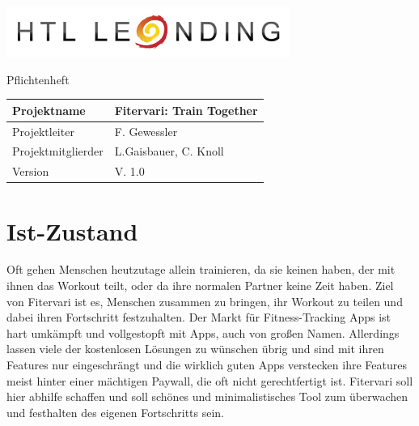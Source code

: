 \documentclass[12pt]{article}
\theoremstyle{definition}
\newcommand{\projektname}{Fitervari: Train Together}
\newcommand{\doctype}{Pflichtenheft}
\newcommand{\projektleiter}{F. Gewessler}
\newcommand{\projektmitglieder}{L.Gaisbauer, C. Knoll}
\newcommand{\version}{V. 1.0}
\begin{document}
\begin{titlepage}
\begin{flushright}
\includegraphics[scale=.5]{htlleondinglogo.png}\\
\end{flushright}

\vspace{10em}

\begin{flushright}

\end{flushright}
\begin{center}
{\LARGE \doctype} \\[3em]
\end{center}
\pagebreak


\begin{flushleft}
\begin{tabular}{|l|l|}
\hline
Projektname & \projektname \\ \hline
Projektleiter & \projektleiter \\ \hline
Projektmitglierder & \projektmitglieder \\ \hline
Version & \version \\ \hline
\end{tabular}
\end{flushleft}

\end{titlepage}

\tableofcontents
\pagebreak

\section{Ist-Zustand}
Oft gehen Menschen heutzutage allein trainieren, da sie keinen haben, der mit ihnen das Workout teilt, oder da ihre normalen Partner keine Zeit haben. Ziel von Fitervari ist es, Menschen zusammen zu bringen, ihr Workout zu teilen und dabei ihren Fortschritt festzuhalten.
Der Markt für Fitness-Tracking Apps ist hart umkämpft und  vollgestopft mit Apps, auch von großen Namen. Allerdings lassen viele der kostenlosen Lösungen zu wünschen übrig und sind mit ihren Features nur eingeschrängt und die wirklich guten Apps verstecken ihre Features meist hinter einer mächtigen Paywall, die oft nicht gerechtfertigt ist. Fitervari soll hier abhilfe schaffen und soll schönes und minimalistisches Tool zum überwachen und festhalten des eigenen Fortschritts sein.
\end{document}
